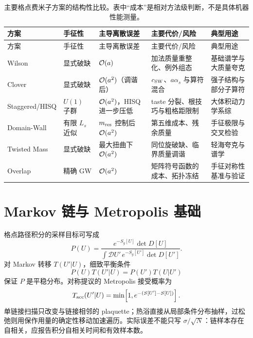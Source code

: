 {\small
\begin{longtable}{L{2.4cm}L{1.8cm}L{2.1cm}L{2.4cm}L{2.8cm}}
\caption{主要格点费米子方案的结构性比较。表中“成本”是相对方法级判断，不是具体机器性能测量。}\label{tab:fermions}\\
\toprule
方案 & 手征性 & 主导离散误差 & 主要代价/风险 & 典型用途\\
\midrule
\endfirsthead
\toprule
方案 & 手征性 & 主导离散误差 & 主要代价/风险 & 典型用途\\
\midrule
\endhead
Wilson & 显式破缺 & \(\mathcal{O}(a)\) & 加法质量重整化、例外组态 & 基础谱学与大质量夸克\\
Clover & 显式破缺 & \(\mathcal{O}(a^2)\)（调谐后） & \(c_{\rm SW}\)、\(a\alpha_s\) 与算符混合 & 强子结构与部分子算符\\
Staggered\slash HISQ & \(U(1)\) 子群 & \(\mathcal{O}(a^2)\)，HISQ 进一步压低 & taste 分裂、根技巧与粗格距限制 & 大体积动力学系综\\
Domain-Wall & 有限 \(L_s\) 近似 & \(m_{\rm res}\) 控制后 \(\mathcal{O}(a^2)\) & 第五维成本、残余质量 & 手征极限与交叉检验\\
Twisted Mass & 显式破缺 & 最大扭曲下 \(\mathcal{O}(a^2)\) & 同位旋破缺、临界质量调谐 & 轻海夸克与谱学\\
Overlap & 精确 GW & \(\mathcal{O}(a^2)\) & 矩阵符号函数的成本、拓扑冻结 & 手征对称性基准与验证\\
\bottomrule
\end{longtable}
}

\section{Markov 链与 Metropolis 基础}

格点路径积分的采样目标可写成
\begin{equation}
  P(U)=\frac{e^{-S_g[U]}\det D[U]}{\int\mathcal DU'\,e^{-S_g[U']}\det D[U']}.
  \label{eq:target-weight}
\end{equation}
对 Markov 转移 \(T(U'|U)\)，细致平衡条件
\begin{equation}
  P(U)T(U'|U)=P(U')T(U|U')
  \label{eq:detailed-balance}
\end{equation}
保证 \(P\) 是平稳分布。对称提议的 Metropolis 接受概率为
\begin{equation}
  T_{\rm acc}(U'|U)=\min\!\left[1,e^{-(S[U']-S[U])}\right].
  \label{eq:metropolis}
\end{equation}
单链接扫描只改变与链接相邻的 plaquette；热浴直接从局部条件分布抽样，过松弛则用保作用量的确定性移动加速遍历。实际误差不能只写 \(\sigma/\sqrt N\)：链样本存在自相关，应报告积分自相关时间和有效样本数。

